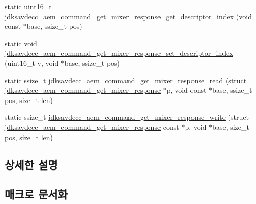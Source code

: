 \begin{DoxyCompactItemize}
\item 
static uint16\+\_\+t \hyperlink{group__command__get__mixer__response_ga339a8e63e5493b79b5352aaab91fe04b}{jdksavdecc\+\_\+aem\+\_\+command\+\_\+get\+\_\+mixer\+\_\+response\+\_\+get\+\_\+descriptor\+\_\+index} (void const $\ast$base, ssize\+\_\+t pos)
\item 
static void \hyperlink{group__command__get__mixer__response_ga0852ed98f901499684453a57596eac18}{jdksavdecc\+\_\+aem\+\_\+command\+\_\+get\+\_\+mixer\+\_\+response\+\_\+set\+\_\+descriptor\+\_\+index} (uint16\+\_\+t v, void $\ast$base, ssize\+\_\+t pos)
\item 
static ssize\+\_\+t \hyperlink{group__command__get__mixer__response_ga767015ec907e019791c9d58c7bee2d86}{jdksavdecc\+\_\+aem\+\_\+command\+\_\+get\+\_\+mixer\+\_\+response\+\_\+read} (struct \hyperlink{structjdksavdecc__aem__command__get__mixer__response}{jdksavdecc\+\_\+aem\+\_\+command\+\_\+get\+\_\+mixer\+\_\+response} $\ast$p, void const $\ast$base, ssize\+\_\+t pos, size\+\_\+t len)
\item 
static ssize\+\_\+t \hyperlink{group__command__get__mixer__response_gad40f48a4b279d79eef8cd47f6631a95f}{jdksavdecc\+\_\+aem\+\_\+command\+\_\+get\+\_\+mixer\+\_\+response\+\_\+write} (struct \hyperlink{structjdksavdecc__aem__command__get__mixer__response}{jdksavdecc\+\_\+aem\+\_\+command\+\_\+get\+\_\+mixer\+\_\+response} const $\ast$p, void $\ast$base, size\+\_\+t pos, size\+\_\+t len)
\end{DoxyCompactItemize}


\subsection{상세한 설명}


\subsection{매크로 문서화}

